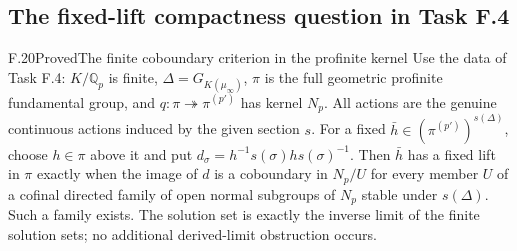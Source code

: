\subsection{The fixed-lift compactness question in Task F.4}

\begin{statement}{F.20}{Proved}{The finite coboundary criterion in the profinite kernel}
Use the data of Task F.4: $K/\mathbb Q_p$ is finite,
$\Delta=G_{K(\mu_\infty)}$, $\pi$ is the full geometric
profinite fundamental group, and
$q:\pi\twoheadrightarrow\pi^{(p')}$ has kernel $N_p$.
All actions are the genuine continuous actions induced
by the given section $s$.
For a fixed $\bar h\in(\pi^{(p')})^{s(\Delta)}$,
choose $h\in\pi$ above it and put
$d_\sigma=h^{-1}s(\sigma)h s(\sigma)^{-1}$.
Then $\bar h$ has a fixed lift in $\pi$ exactly when
the image of $d$ is a coboundary in $N_p/U$ for every
member $U$ of a cofinal directed family of open normal
subgroups of $N_p$ stable under $s(\Delta)$.
Such a family exists.  The solution set is exactly
the inverse limit of the finite solution sets; no
additional derived-limit obstruction occurs.
\end{statement}
